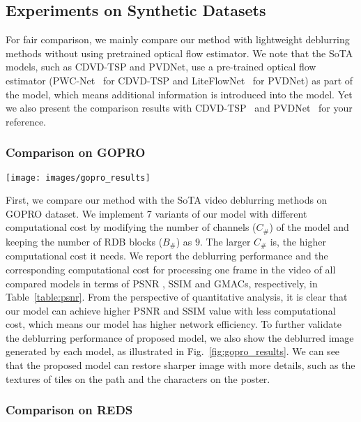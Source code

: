 \documentclass[twocolumn]{svjour3}          \smartqed  \usepackage{graphicx}
\begin{document}
\subsection{Experiments on Synthetic Datasets}

For fair comparison, we mainly compare our method with lightweight deblurring methods without using pretrained optical flow estimator. We note that the SoTA models, such as CDVD-TSP and PVDNet, use a pre-trained optical flow estimator (PWC-Net~\cite{sun2018pwc} for CDVD-TSP and LiteFlowNet~\cite{hui2018liteflownet} for PVDNet) as part of the model, which means additional information is introduced into the model. Yet we also present the comparison results with CDVD-TSP~\cite{pan2020cascaded} and PVDNet~\cite{son2021recurrent} for your reference.

\subsubsection{Comparison on GOPRO}
\begin{figure*}[!t]
	\centering
	\texttt{[image: images/gopro\_results]}
	\caption{Visual comparisons on GOPRO~\cite{nah2017deep}.}
	\label{fig:gopro_results}
\end{figure*}

First, we compare our method with the SoTA video deblurring methods on GOPRO dataset. We implement 7 variants of our model with different computational cost by modifying the number of channels ($C_{\#}$) of the model and keeping the number of RDB blocks ($B_{\#}$) as $9$. The larger $C_{\#}$ is, the higher computational cost it needs. We report the deblurring performance and the corresponding computational cost for processing one frame in the video of all compared models in terms of PSNR \cite{hore2010image}, SSIM and GMACs, respectively, in Table~\ref{table:psnr}. From the perspective of quantitative analysis, it is clear that our model can achieve higher PSNR and SSIM value with less computational cost, which means our model has higher network efficiency. To further validate the deblurring performance of proposed model, we also show the deblurred image generated by each model, as illustrated in Fig.~\ref{fig:gopro_results}. We can see that the proposed model can restore sharper image with more details, such as the textures of tiles on the path and the characters on the poster.

\subsubsection{Comparison on REDS}
\end{document}

